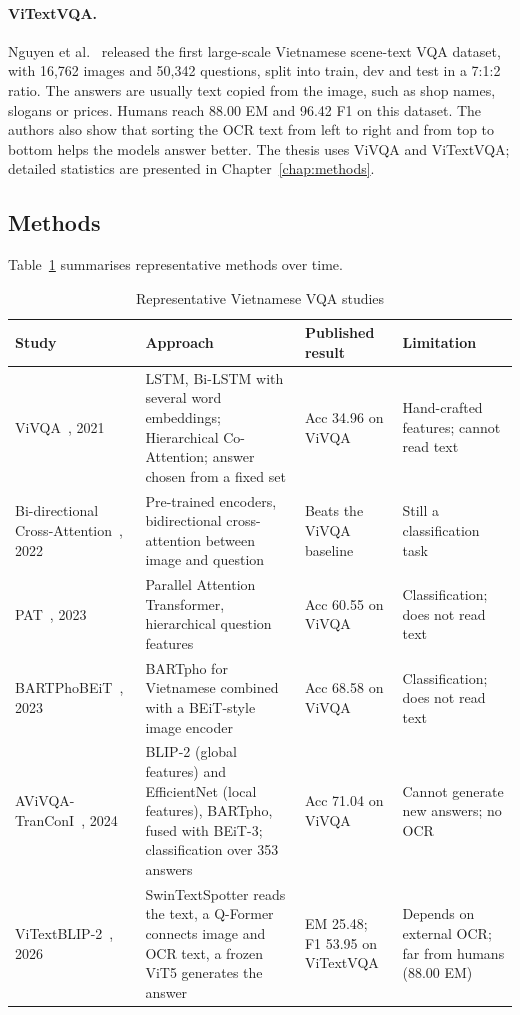 \paragraph{ViTextVQA.} Nguyen et al.~\cite{nguyen2024vitextvqa} released the first
large-scale Vietnamese scene-text VQA dataset, with 16,762 images and 50,342 questions,
split into train, dev and test in a 7:1:2 ratio. The answers are usually text copied
from the image, such as shop names, slogans or prices. Humans reach 88.00 EM and 96.42
F1 on this dataset. The authors also show that sorting the OCR text from left to right
and from top to bottom helps the models answer better. The thesis uses ViVQA and
ViTextVQA; detailed statistics are presented in Chapter~\ref{chap:methods}.

\subsection{Methods}

Table~\ref{tab:rel-vivqa} summarises representative methods over time.

\begin{table}[htbp]
\caption{Representative Vietnamese VQA studies}
\label{tab:rel-vivqa}
\centering
\small
\begin{tabular}{p{}p{}p{}p{}}
\toprule
\textbf{Study} & \textbf{Approach} & \textbf{Published result} & \textbf{Limitation} \\
\midrule
ViVQA~\cite{tran2021vivqa}, 2021 & LSTM, Bi-LSTM with several word embeddings; Hierarchical Co-Attention; answer chosen from a fixed set & Acc 34.96 on ViVQA & Hand-crafted features; cannot read text \\
Bi-directional Cross-Attention~\cite{nguyentran2022bica}, 2022 & Pre-trained encoders, bidirectional cross-attention between image and question & Beats the ViVQA baseline & Still a classification task \\
PAT~\cite{nguyen2023pat}, 2023 & Parallel Attention Transformer, hierarchical question features & Acc 60.55 on ViVQA & Classification; does not read text \\
BARTPhoBEiT~\cite{tran2023bartphobeit}, 2023 & BARTpho for Vietnamese combined with a BEiT-style image encoder & Acc 68.58 on ViVQA & Classification; does not read text \\
AViVQA-TranConI~\cite{nguyen2024tranconi}, 2024 & BLIP-2 (global features) and EfficientNet (local features), BARTpho, fused with BEiT-3; classification over 353 answers & Acc 71.04 on ViVQA & Cannot generate new answers; no OCR \\
ViTextBLIP-2~\cite{nguyen2024vitextvqa}, 2026 & SwinTextSpotter reads the text, a Q-Former connects image and OCR text, a frozen ViT5 generates the answer & EM 25.48; F1 53.95 on ViTextVQA & Depends on external OCR; far from humans (88.00 EM) \\
\bottomrule
\end{tabular}
\end{table}

